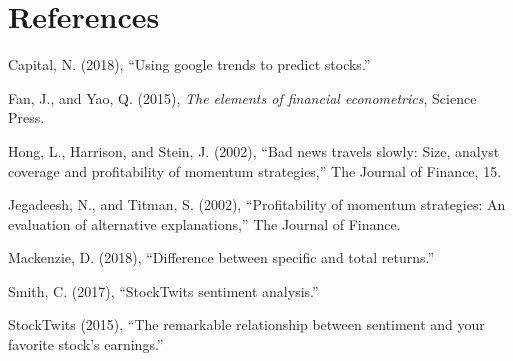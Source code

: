 \documentclass[11pt,]{article}
\begin{document}
\section{References}\label{references}

\noindent 

\hypertarget{refs}{}
\hypertarget{ref-Nairu2018}{}
Capital, N. (2018), ``Using google trends to predict stocks.''

\hypertarget{ref-Fan2015}{}
Fan, J., and Yao, Q. (2015), \emph{The elements of financial
econometrics}, Science Press.

\hypertarget{ref-Hong}{}
Hong, L., Harrison, and Stein, J. (2002), ``Bad news travels slowly:
Size, analyst coverage and profitability of momentum strategies,'' The
Journal of Finance, 15.

\hypertarget{ref-Jeg}{}
Jegadeesh, N., and Titman, S. (2002), ``Profitability of momentum
strategies: An evaluation of alternative explanations,'' The Journal of
Finance.

\hypertarget{ref-Quant}{}
Mackenzie, D. (2018), ``Difference between specific and total returns.''

\hypertarget{ref-Smith2018}{}
Smith, C. (2017), ``StockTwits sentiment analysis.''

\hypertarget{ref-Stocktwits2015}{}
StockTwits (2015), ``The remarkable relationship between sentiment and
your favorite stock's earnings.''
\newpage
\singlespacing 
\end{document}

